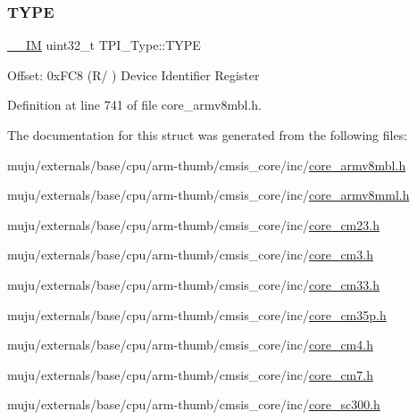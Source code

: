 \subsubsection{\texorpdfstring{T\+Y\+PE}{TYPE}}
{\footnotesize\ttfamily \hyperlink{core__sc300_8h_a4cc1649793116d7c2d8afce7a4ffce43}{\+\_\+\+\_\+\+IM} uint32\+\_\+t T\+P\+I\+\_\+\+Type\+::\+T\+Y\+PE}

Offset\+: 0x\+F\+C8 (R/ ) Device Identifier Register 

Definition at line 741 of file core\+\_\+armv8mbl.\+h.



The documentation for this struct was generated from the following files\+:\begin{DoxyCompactItemize}
\item 
muju/externals/base/cpu/arm-\/thumb/cmsis\+\_\+core/inc/\hyperlink{core__armv8mbl_8h}{core\+\_\+armv8mbl.\+h}\item 
muju/externals/base/cpu/arm-\/thumb/cmsis\+\_\+core/inc/\hyperlink{core__armv8mml_8h}{core\+\_\+armv8mml.\+h}\item 
muju/externals/base/cpu/arm-\/thumb/cmsis\+\_\+core/inc/\hyperlink{core__cm23_8h}{core\+\_\+cm23.\+h}\item 
muju/externals/base/cpu/arm-\/thumb/cmsis\+\_\+core/inc/\hyperlink{core__cm3_8h}{core\+\_\+cm3.\+h}\item 
muju/externals/base/cpu/arm-\/thumb/cmsis\+\_\+core/inc/\hyperlink{core__cm33_8h}{core\+\_\+cm33.\+h}\item 
muju/externals/base/cpu/arm-\/thumb/cmsis\+\_\+core/inc/\hyperlink{core__cm35p_8h}{core\+\_\+cm35p.\+h}\item 
muju/externals/base/cpu/arm-\/thumb/cmsis\+\_\+core/inc/\hyperlink{core__cm4_8h}{core\+\_\+cm4.\+h}\item 
muju/externals/base/cpu/arm-\/thumb/cmsis\+\_\+core/inc/\hyperlink{core__cm7_8h}{core\+\_\+cm7.\+h}\item 
muju/externals/base/cpu/arm-\/thumb/cmsis\+\_\+core/inc/\hyperlink{core__sc300_8h}{core\+\_\+sc300.\+h}\end{DoxyCompactItemize}
